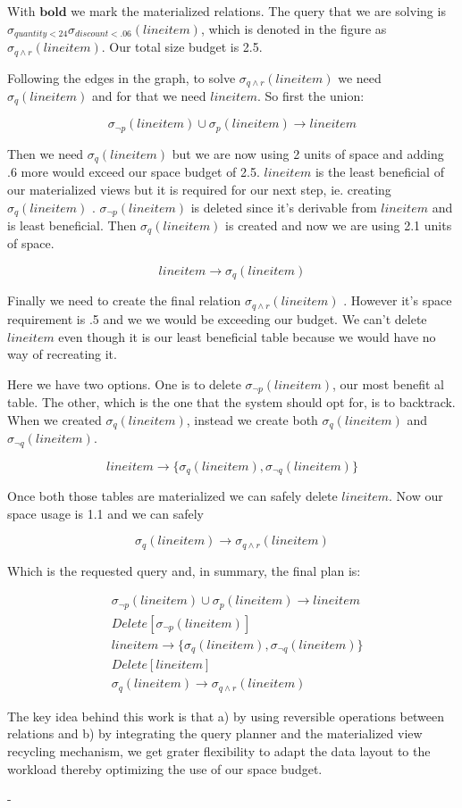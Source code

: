With \(\boldsymbol{bold}\) we mark the materialized relations. The query
that we are solving is \(\sigma_{quantity < 24} \sigma_{discount < .06}
(lineitem)\), which is denoted in the figure as \(\sigma_{q \land
  r}(lineitem)\). Our total size budget is 2.5.

Following the edges in the graph, to solve \(\sigma_{q \land
  r}(lineitem)\) we need \(\sigma_{q}(lineitem)\) and for that we need
\(lineitem\). So first the union:

\[
  \sigma_{\neg p}(lineitem) \cup \sigma_{p}(lineitem) \rightarrow lineitem
\]

Then we need \(\sigma_{q}(lineitem)\) but we are now using 2 units of
space and adding .6 more would exceed our space budget of
2.5. \(lineitem\) is the least beneficial of our materialized views
but it is required for our next step, ie. creating
\(\sigma_{q}(lineitem)\) . \(\sigma_{\neg p}(lineitem)\) is deleted
since it's derivable from \(lineitem\) and is least beneficial. Then
\(\sigma_{q}(lineitem)\) is created and now we are using 2.1 units of
space.

\[
  lineitem \rightarrow \sigma_{q}(lineitem)
\]

Finally we need to create the final relation \(\sigma_{q \land
  r}(lineitem)\) . However it's space requirement is .5 and we we would
be exceeding our budget. We can't delete \(lineitem\) even though it
is our least beneficial table because we would have no way of
recreating it.

Here we have two options. One is to delete \(\sigma_{\neg
  p}(lineitem)\), our most benefit al table. The other, which is the one
that the system should opt for, is to backtrack. When we created
\(\sigma_{q}(lineitem)\), instead we create both
\(\sigma_{q}(lineitem)\) and \(\sigma_{\neg q}(lineitem)\).

\[
  lineitem \rightarrow \{\sigma_{q}(lineitem), \sigma_{\neg q}(lineitem)\}
\]

Once both those tables are materialized we can safely delete
\(lineitem\). Now our space usage is 1.1 and we can safely

\[
  \sigma_{q}(lineitem) \rightarrow \sigma_{q \land r} (lineitem)
\]

Which is the requested query and, in summary, the final plan is:

\begin{align*}
  &\sigma_{\neg p}(lineitem) \cup \sigma_{p}(lineitem) \rightarrow lineitem \\
  &Delete[\sigma_{\neg p}(lineitem)] \\
  &lineitem \rightarrow \{\sigma_{q}(lineitem), \sigma_{\neg q}(lineitem)\} \\
  &Delete[lineitem] \\
  &\sigma_{q}(lineitem) \rightarrow \sigma_{q \land r} (lineitem)
\end{align*}

The key idea behind this work is that a) by using reversible
operations between relations and b) by integrating the query planner
and the materialized view recycling mechanism, we get grater
flexibility to adapt the data layout to the workload thereby
optimizing the use of our space budget.

-
